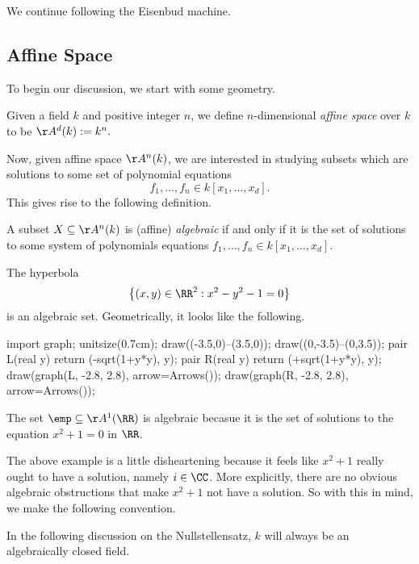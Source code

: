 
We continue following the Eisenbud machine.

\subsection{Affine Space}
To begin our discussion, we start with some geometry.
\begin{definition}
	Given a field $k$ and positive integer $n$, we define $n$-dimensional \textit{affine space} over $k$ to be $\AA^d(k):=k^n.$
\end{definition}
Now, given affine space $\AA^n(k)$, we are interested in studying subsets which are solutions to some set of polynomial equations
\[f_1,\ldots,f_n\in k[x_1,\ldots,x_d].\]
This gives rise to the following definition.
\begin{definition}[Algebraic]
	A subset $X\subseteq\AA^n(k)$ is (affine) \textit{algebraic} if and only if it is the set of solutions to some system of polynomials equations $f_1,\ldots,f_n\in k[x_1,\ldots,x_d]$.
\end{definition}
\begin{example}
	The hyperbola
	\[\left\{(x,y)\in\RR^2:x^2-y^2-1=0\right\}\]
	is an algebraic set. Geometrically, it looks like the following.
	\begin{center}
		\begin{asy}
			import graph;
			unitsize(0.7cm);
			draw((-3.5,0)--(3.5,0)); draw((0,-3.5)--(0,3.5));
			pair L(real y)
			{
				return (-sqrt(1+y*y), y);
			}
			pair R(real y)
			{
				return (+sqrt(1+y*y), y);
			}
			draw(graph(L, -2.8, 2.8), arrow=Arrows());
			draw(graph(R, -2.8, 2.8), arrow=Arrows());
		\end{asy}
	\end{center}
\end{example}
\begin{example} \label{ex:notalgclosed}
	The set $\emp\subseteq\AA^1(\RR)$ is algebraic becasue it is the set of solutions to the equation $x^2+1=0$ in $\RR$.
\end{example}
The above example is a little disheartening because it feels like $x^2+1$ really ought to have a solution, namely $i\in\CC$. More explicitly, there are no obvious algebraic obstructions that make $x^2+1$ not have a solution. So with this in mind, we make the following convention.
\begin{convention}
	In the following discussion on the Nullstellensatz, $k$ will always be an algebraically closed field.
\end{convention}

